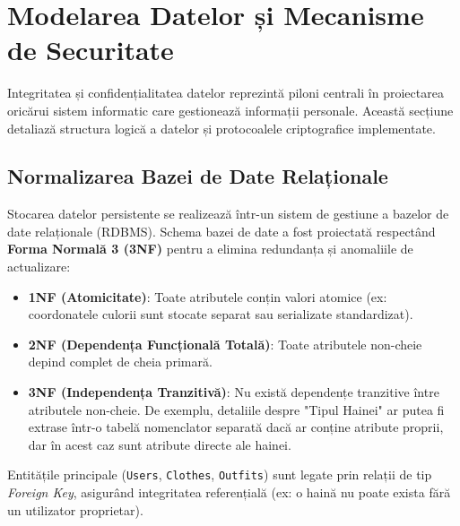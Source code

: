 \section{Modelarea Datelor și Mecanisme de Securitate}

Integritatea și confidențialitatea datelor reprezintă piloni centrali în proiectarea oricărui sistem informatic care gestionează informații personale. Această secțiune detaliază structura logică a datelor și protocoalele criptografice implementate.

\subsection{Normalizarea Bazei de Date Relaționale}
Stocarea datelor persistente se realizează într-un sistem de gestiune a bazelor de date relaționale (RDBMS). Schema bazei de date a fost  proiectată respectând \textbf{Forma Normală 3 (3NF)} pentru a elimina redundanța și anomaliile de actualizare:
\begin{itemize}
    \item \textbf{1NF (Atomicitate)}: Toate atributele conțin valori atomice (ex: coordonatele culorii sunt stocate separat sau serializate standardizat).
    \item \textbf{2NF (Dependența Funcțională Totală)}: Toate atributele non-cheie depind complet de cheia primară.
    \item \textbf{3NF (Independența Tranzitivă)}: Nu există dependențe tranzitive între atributele non-cheie. De exemplu, detaliile despre "Tipul Hainei" ar putea fi extrase într-o tabelă nomenclator separată dacă ar conține atribute proprii, dar în acest caz sunt atribute directe ale hainei.
\end{itemize}

Entitățile principale (\texttt{Users}, \texttt{Clothes}, \texttt{Outfits}) sunt legate prin relații de tip \textit{Foreign Key}, asigurând integritatea referențială (ex: o haină nu poate exista fără un utilizator proprietar).

